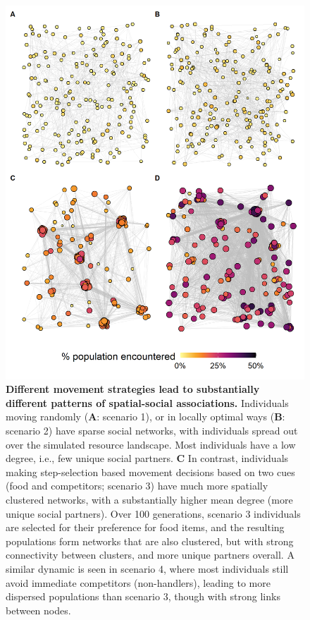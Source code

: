 \begin{interludeenv}
\begin{figure}[h]
    \centering
    \includegraphics[width=0.9\linewidth]{figures/introduction/fig_networks.png}
    \caption{
        \textbf{Different movement strategies lead to substantially different patterns of spatial-social associations.}
        Individuals moving randomly (\textbf{A}: scenario 1), or in locally optimal ways (\textbf{B}: scenario 2) have sparse social networks, with individuals spread out over the simulated resource landscape.
        Most individuals have a low degree, i.e., few unique social partners.
        \textbf{C} In contrast, individuals making step-selection based movement decisions based on two cues (food and competitors; scenario 3) have much more spatially clustered networks, with a substantially higher mean degree (more unique social partners).
        Over 100 generations, scenario 3 individuals are selected for their preference for food items, and the resulting populations form networks that are also clustered, but with strong connectivity between clusters, and more unique partners overall.
        A similar dynamic is seen in scenario 4, where most individuals still avoid immediate competitors (non-handlers), leading to more dispersed populations than scenario 3, though with strong links between nodes.
    }
    \label{fig:demo_networks}
  \end{figure}


\end{interludeenv}
